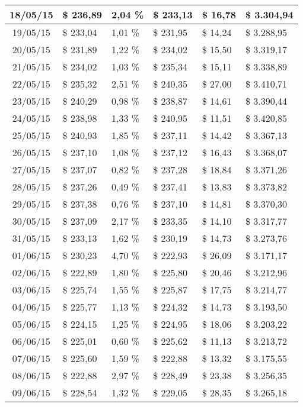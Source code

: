 \begin{small}
\begin{longtable}{|c|l|l|l|l|l|}
18/05/15 & \$ 236,89 & 2,04 \% & \$ 233,13 & \$ 16,78 & \$ 3.304,94 \\ \hline
19/05/15 & \$ 233,04 & 1,01 \% & \$ 231,95 & \$ 14,24 & \$ 3.288,95 \\ \hline
20/05/15 & \$ 231,89 & 1,22 \% & \$ 234,02 & \$ 15,50 & \$ 3.319,17 \\ \hline
21/05/15 & \$ 234,02 & 1,03 \% & \$ 235,34 & \$ 15,11 & \$ 3.338,89 \\ \hline
22/05/15 & \$ 235,32 & 2,51 \% & \$ 240,35 & \$ 27,00 & \$ 3.410,71 \\ \hline
23/05/15 & \$ 240,29 & 0,98 \% & \$ 238,87 & \$ 14,61 & \$ 3.390,44 \\ \hline
24/05/15 & \$ 238,98 & 1,33 \% & \$ 240,95 & \$ 11,51 & \$ 3.420,85 \\ \hline
25/05/15 & \$ 240,93 & 1,85 \% & \$ 237,11 & \$ 14,42 & \$ 3.367,13 \\ \hline
26/05/15 & \$ 237,10 & 1,08 \% & \$ 237,12 & \$ 16,43 & \$ 3.368,07 \\ \hline
27/05/15 & \$ 237,07 & 0,82 \% & \$ 237,28 & \$ 18,84 & \$ 3.371,26 \\ \hline
28/05/15 & \$ 237,26 & 0,49 \% & \$ 237,41 & \$ 13,83 & \$ 3.373,82 \\ \hline
29/05/15 & \$ 237,38 & 0,76 \% & \$ 237,10 & \$ 14,81 & \$ 3.370,30 \\ \hline
30/05/15 & \$ 237,09 & 2,17 \% & \$ 233,35 & \$ 14,10 & \$ 3.317,77 \\ \hline
31/05/15 & \$ 233,13 & 1,62 \% & \$ 230,19 & \$ 14,73 & \$ 3.273,76 \\ \hline
01/06/15 & \$ 230,23 & 4,70 \% & \$ 222,93 & \$ 26,09 & \$ 3.171,17 \\ \hline
02/06/15 & \$ 222,89 & 1,80 \% & \$ 225,80 & \$ 20,46 & \$ 3.212,96 \\ \hline
03/06/15 & \$ 225,74 & 1,55 \% & \$ 225,87 & \$ 17,75 & \$ 3.214,77 \\ \hline
04/06/15 & \$ 225,77 & 1,13 \% & \$ 224,32 & \$ 14,73 & \$ 3.193,50 \\ \hline
05/06/15 & \$ 224,15 & 1,25 \% & \$ 224,95 & \$ 18,06 & \$ 3.203,22 \\ \hline
06/06/15 & \$ 225,01 & 0,60 \% & \$ 225,62 & \$ 11,13 & \$ 3.213,72 \\ \hline
07/06/15 & \$ 225,60 & 1,59 \% & \$ 222,88 & \$ 13,32 & \$ 3.175,55 \\ \hline
08/06/15 & \$ 222,88 & 2,97 \% & \$ 228,49 & \$ 23,38 & \$ 3.256,35 \\ \hline
09/06/15 & \$ 228,54 & 1,32 \% & \$ 229,05 & \$ 28,35 & \$ 3.265,18 \\ \hline

\end{longtable}
\end{small}
